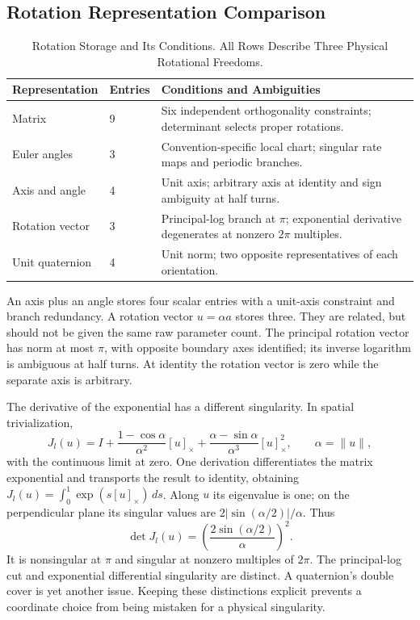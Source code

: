 \subsection{Rotation Representation Comparison}
\label{sec:rotation_comparison}

\begin{table}[htbp]
\centering
\caption{Rotation Storage and Its Conditions. All Rows Describe Three Physical Rotational Freedoms.}
\label{tab:rotation_comparison}
\begin{tabular}{p{.24\linewidth}p{.14\linewidth}p{.46\linewidth}}
\toprule
Representation & Entries & Conditions and Ambiguities \\
\midrule
Matrix & 9 & Six independent orthogonality constraints; determinant selects proper rotations. \\
Euler angles & 3 & Convention-specific local chart; singular rate maps and periodic branches. \\
Axis and angle & 4 & Unit axis; arbitrary axis at identity and sign ambiguity at half turns. \\
Rotation vector & 3 & Principal-log branch at $\pi$; exponential derivative degenerates at nonzero $2\pi$ multiples. \\
Unit quaternion & 4 & Unit norm; two opposite representatives of each orientation. \\
\bottomrule
\end{tabular}
\end{table}

An axis plus an angle stores four scalar entries with a unit-axis constraint and branch redundancy. A rotation vector $u=\alpha a$ stores three. They are related, but should not be given the same raw parameter count. The principal rotation vector has norm at most $\pi$, with opposite boundary axes identified; its inverse logarithm is ambiguous at half turns. At identity the rotation vector is zero while the separate axis is arbitrary.

The derivative of the exponential has a different singularity. In spatial trivialization,
\begin{equation}
 J_l(u)=I+\frac{1-\cos\alpha}{\alpha^2}[u]_\times
       +\frac{\alpha-\sin\alpha}{\alpha^3}[u]_\times^2,\qquad \alpha=\|u\|,
 \label{eq:rotation_exponential_differential}
\end{equation}
with the continuous limit at zero. One derivation differentiates the matrix exponential and transports the result to identity, obtaining $J_l(u)=\int_0^1\exp(s[u]_\times)\,ds$. Along $u$ its eigenvalue is one; on the perpendicular plane its singular values are $2|\sin(\alpha/2)|/\alpha$. Thus
\begin{equation}
 \det J_l(u)=\left(\frac{2\sin(\alpha/2)}{\alpha}\right)^2.
 \label{eq:rotation_exponential_rank}
\end{equation}
It is nonsingular at $\pi$ and singular at nonzero multiples of $2\pi$. The principal-log cut and exponential differential singularity are distinct. A quaternion's double cover is yet another issue. Keeping these distinctions explicit prevents a coordinate choice from being mistaken for a physical singularity.

